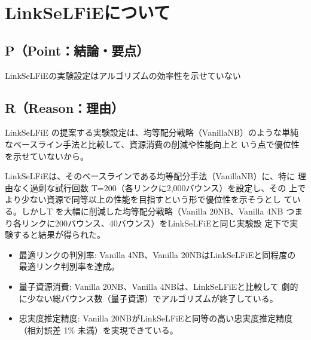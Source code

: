 \documentclass[technicalreport,dvipdfmx]{ieicej}
\begin{document}


\maketitle


\section{LinkSeLFiEについて}
\label{sec:org1496e87}
\subsection{P（Point：結論・要点）}
\label{sec:org9765c44}
LinkSeLFiEの実験設定はアルゴリズムの効率性を示せていない

\subsection{R（Reason：理由）}
\label{sec:org0389ae0}
LinkSeLFiE の提案する実験設定は、均等配分戦略（VanillaNB）のような単純
なベースライン手法と比較して、資源消費の削減や性能向上と
いう点で優位性を示せていないから。

LinkSeLFiEは、そのベースラインである均等配分手法（VanillaNB）に、特に
理由なく過剰な試行回数 T=200（各リンクに2,000バウンス）を設定し、その
上でより少ない資源で同等以上の性能を目指すという形で優位性を示そうとし
ている。しかしT を大幅に削減した均等配分戦略（Vanilla 20NB、Vanilla
4NB つまり各リンクに200バウンス、40バウンス）をLinkSeLFiEと同じ実験設
定下で実験すると結果が得られた。

\begin{itemize}
\item 最適リンクの判別率: Vanilla 4NB、Vanilla 20NBはLinkSeLFiEと同程度の
最適リンク判別率を達成。

\item 量子資源消費: Vanilla 20NB、Vanilla 4NBは、LinkSeLFiEと比較して
劇的に少ない総バウンス数（量子資源）でアルゴリズムが終了している。

\item 忠実度推定精度: Vanilla 20NBがLinkSeLFiEと同等の高い忠実度推定精度
（相対誤差 1\% 未満）を実現できている。
\end{itemize}
\end{document}

